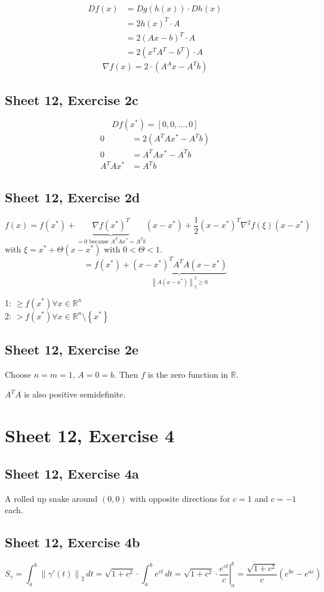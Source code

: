 \documentclass{article}
\newcommand{\set}[1]{\left\{#1\right\}}
\newcommand{\norm}[1]{\left\|#1\right\|}
\begin{document}
\begin{align*}
  Df(x) &= Dg(h(x)) \cdot Dh(x) \\
    &= 2h(x)^T \cdot A \\
    &= 2(Ax - b)^T \cdot A \\
    &= 2(x^T A^T - b^T) \cdot A
\end{align*}
\[ \nabla f(x) = 2 \cdot \left(A^A x - A^T b\right) \]

\subsection{Sheet 12, Exercise 2c}

\[ D f(x^*) = [0, 0, \dots, 0] \]
\begin{align*}
  0 &= 2 (A^T Ax^* - A^T b) \\
  0 &= A^T Ax^* - A^T b \\
  A^T Ax^* &= A^T b
\end{align*}

\subsection{Sheet 12, Exercise 2d}

\[ f(x) = f(x^*) + \underbrace{\nabla f(x^*)^T}_{=0 \text{ because } A^T Ax^* = A^T b} (x - x^*) + \frac12 (x - x^*)^T \nabla^2 f(\xi) (x - x^*) \]
with $\xi = x^* + \Theta(x - x^*)$ with $0 < \Theta < 1$.
\[ = f(x^*) + \underbrace{(x - x^*)^T A^T A (x - x^*)}_{\norm{A(x - x^*)}_2^2 \geq 0} \]

1: $\geq f(x^*) \forall x \in \mathbb R^n$ \\
2: $> f(x^*) \forall x \in \mathbb R^n \setminus \set{x^*}$

\subsection{Sheet 12, Exercise 2e}
Choose $n = m = 1$, $A = 0 = b$.
Then $f$ is the zero function in $\mathbb R$.

$A^T A$ is also positive semidefinite.

\section{Sheet 12, Exercise 4}
\subsection{Sheet 12, Exercise 4a}
A rolled up snake around $(0, 0)$ with opposite directions for $c=1$ and $c=-1$ each.

\subsection{Sheet 12, Exercise 4b}
\[ S_\gamma = \int_a^b \norm{\gamma'(t)}_2 \, dt = \sqrt{1 + c^2} \cdot \int_a^b e^{ct} \, dt = \sqrt{1 + c^2} \cdot \left.\frac{e^{ct}}{c}\right|_a^b = \frac{\sqrt{1 + c^2}}{c} (e^{bc} - e^{ac})\]
\end{document}
